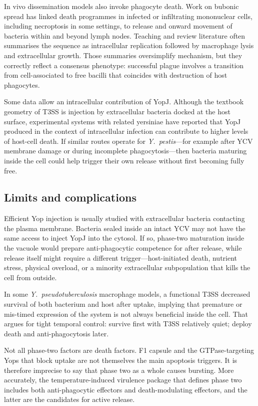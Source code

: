 \documentclass[11pt,a4paper]{article}
\begin{document}
In vivo dissemination models also invoke phagocyte death. Work on bubonic spread has linked death programmes in infected or infiltrating mononuclear cells, including necroptosis in some settings, to release and onward movement of bacteria within and beyond lymph nodes. Teaching and review literature often summarises the sequence as intracellular replication followed by macrophage lysis and extracellular growth. Those summaries oversimplify mechanism, but they correctly reflect a consensus phenotype: successful plague involves a transition from cell-associated to free bacilli that coincides with destruction of host phagocytes.

Some data allow an intracellular contribution of YopJ. Although the textbook geometry of T3SS is injection by extracellular bacteria docked at the host surface, experimental systems with related yersiniae have reported that YopJ produced in the context of intracellular infection can contribute to higher levels of host-cell death. If similar routes operate for \textit{Y.\ pestis}---for example after YCV membrane damage or during incomplete phagocytosis---then bacteria maturing inside the cell could help trigger their own release without first becoming fully free.

\subsection{Limits and complications}

Efficient Yop injection is usually studied with extracellular bacteria contacting the plasma membrane. Bacteria sealed inside an intact YCV may not have the same access to inject YopJ into the cytosol. If so, phase-two maturation inside the vacuole would prepare anti-phagocytic competence for after release, while release itself might require a different trigger---host-initiated death, nutrient stress, physical overload, or a minority extracellular subpopulation that kills the cell from outside.

In some \textit{Y.\ pseudotuberculosis} macrophage models, a functional T3SS decreased survival of both bacterium and host after uptake, implying that premature or mis-timed expression of the system is not always beneficial inside the cell. That argues for tight temporal control: survive first with T3SS relatively quiet; deploy death and anti-phagocytosis later.

Not all phase-two factors are death factors. F1 capsule and the GTPase-targeting Yops that block uptake are not themselves the main apoptosis triggers. It is therefore imprecise to say that phase two as a whole causes bursting. More accurately, the temperature-induced virulence package that defines phase two includes both anti-phagocytic effectors and death-modulating effectors, and the latter are the candidates for active release.
\end{document}

